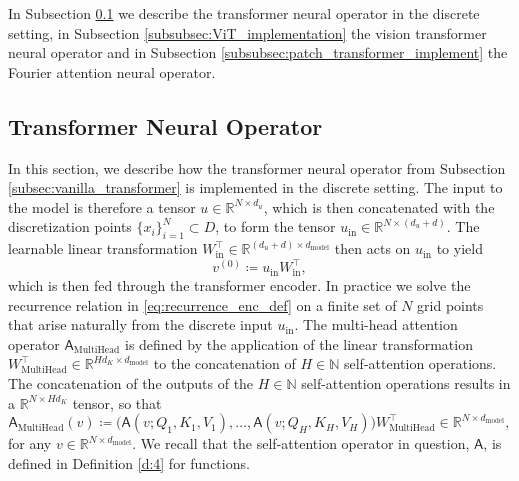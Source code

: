 \documentclass[twoside]{article}
\newcommand{\1}{\mathbbm{1}}
\newcommand{\R}{\mathbbm{R}}
\newcommand{\N}{\mathbbm{N}}
\newcommand{\sA}{\mathsf{A}}
\newcommand{\sE}{\mathsf{E}}
\newcommand{\ml}[1]{{\color{cyan}{#1}}}
\providecommand{\mathbbm}{\mathbb} %
\begin{document}

In Subsection \ref{subsubsec:vanilla_transformer_implement} we describe the transformer neural operator in the discrete setting, in Subsection \ref{subsubsec:ViT_implementation} the vision transformer neural operator and in Subsection \ref{subsubsec:patch_transformer_implement} the Fourier attention neural operator.

\subsection{Transformer Neural Operator}
\label{subsubsec:vanilla_transformer_implement}

In this section, we describe how the transformer neural operator from Subsection \ref{subsec:vanilla_transformer} is implemented in the discrete setting. The input to the model is therefore a tensor $u\in \R^{N \times d_u}$,
which
is then concatenated with the discretization points $\{x_i\}_{i=1}^N\subset D$, to form the tensor $u_{\textrm{in}}\in \R^{N \times (d_u+d)}$. The learnable linear transformation $W_{\textrm{in}}^\top\in \R^{(d_u+d) \times d_\textrm{model} }$ then acts on $u_{\textrm{in}}$ to yield
\[
v^{(0)}\coloneqq u_{\textrm{in}}W_{\textrm{in}}^\top,
\]
which
is then fed through the transformer encoder.
In practice we solve the recurrence relation in \eqref{eq:recurrence_enc_def} on a finite set of $N$ grid points that arise naturally from the discrete input $u_\textrm{in}$.
The multi-head attention operator $\sA_{\textrm{MultiHead}}$ is defined by the application of the linear transformation $W_{\textrm{MultiHead}}^\top\in \R^{Hd_K\times d_{\textrm{model}} }$ to the concatenation of $H\in\N$ self-attention operations. The concatenation of the outputs of the $H\in\N$ self-attention operations results in a $\R^{N\times Hd_K}$ tensor, so that
\begin{equation}
\label{eq:multihead_implement}
    \sA_{\textrm{MultiHead}}(v) \coloneqq  \bigl(\sA(v;Q_1,K_1,V_1),\ldots, \sA(v;Q_H,K_H,V_H)  \bigr) {W}_{\textrm{MultiHead}}^\top \in \R^{N\times d_{\textrm{model}}},
\end{equation}
for any $v\in \R^{N\times d_{\textrm{model}}}$. We recall that the self-attention operator in question, $\sA$, is defined in Definition \ref{d:4} for functions.
\end{document}
